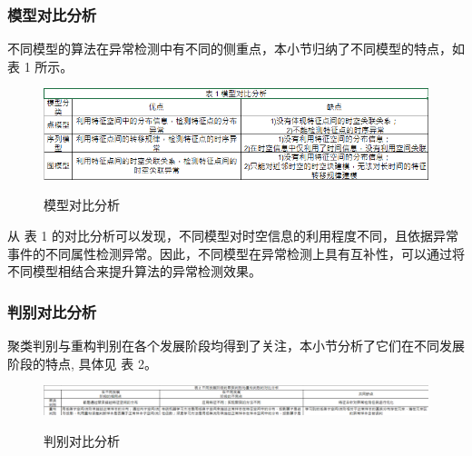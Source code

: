 \documentclass[UTF8]{ctexart}
\begin{document}
\subsubsection{模型对比分析}
不同模型的算法在异常检测中有不同的侧重点，本小节归纳了不同模型的特点，如 表 1 所示。
\begin{figure}[H] 
\centering 
\includegraphics[width=1.0\textwidth]{compare1.png} 
\caption{模型对比分析} 
\protect\cite{qh2020}
\end{figure}
从 表 1 的对比分析可以发现，不同模型对时空信息的利用程度不同，且依据异常事件的不同属性检测异常。因此，不同模型在异常检测上具有互补性，可以通过将不同模型相结合来提升算法的异常检测效果。

\subsubsection{判别对比分析}
聚类判别与重构判别在各个发展阶段均得到了关注，本小节分析了它们在不同发展阶段的特点, 具体见 表 2。
\begin{figure}[H] 
\centering 
\includegraphics[width=1.0\textwidth]{compare2.png} 
\caption{判别对比分析} 
\protect\cite{qh2020}
\end{figure}



\end{document}
